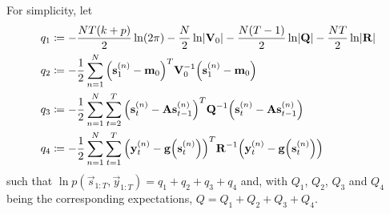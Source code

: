 	For simplicity, let
	\begin{align*}
		q_1 &\coloneqq -\frac{NT(k + p)}{2} \ln(2\pi) - \frac{N}{2} \ln \lvert \boldsymbol{\mathrm{V}}_0 \rvert - \frac{N(T - 1)}{2} \ln \lvert \boldsymbol{\mathrm{Q}} \rvert - \frac{NT}{2} \ln \lvert \boldsymbol{\mathrm{R}} \rvert \\
		q_2 &\coloneqq -\frac{1}{2} \sum_{n = 1}^{N} \Big( \boldsymbol{\mathrm{s}}_1^{(n)} - \boldsymbol{\mathrm{m}}_0 \Big)^T \boldsymbol{\mathrm{V}}_0^{-1} \Big( \boldsymbol{\mathrm{s}}_1^{(n)} - \boldsymbol{\mathrm{m}}_0 \Big) \\
		q_3 &\coloneqq -\frac{1}{2} \sum_{n = 1}^{N} \sum_{t = 2}^{T} \Big( \boldsymbol{\mathrm{s}}_t^{(n)} - \boldsymbol{\mathrm{A}} \boldsymbol{\mathrm{s}}_{t - 1}^{(n)} \Big)^T \boldsymbol{\mathrm{Q}}^{-1} \Big( \boldsymbol{\mathrm{s}}_t^{(n)} - \boldsymbol{\mathrm{A}} \boldsymbol{\mathrm{s}}_{t - 1}^{(n)} \Big) \\
		q_4 &\coloneqq -\frac{1}{2} \sum_{n = 1}^{N} \sum_{t = 1}^{T} \Big( \boldsymbol{\mathrm{y}}_t^{(n)} - \boldsymbol{\mathrm{g}}\Big(\boldsymbol{\mathrm{s}}_t^{(n)}\Big) \Big)^T \boldsymbol{\mathrm{R}}^{-1} \Big( \boldsymbol{\mathrm{y}}_t^{(n)} - \boldsymbol{\mathrm{g}}\Big(\boldsymbol{\mathrm{s}}_t^{(n)}\Big) \Big)
	\end{align*}
	such that \( \ln p(\vec{s}_{1:T}, \vec{y}_{1:T}) = q_1 + q_2 + q_3 + q_4 \) and, with \(Q_1\), \(Q_2\), \(Q_3\) and \(Q_4\) being the corresponding expectations, \( Q = Q_1 + Q_2 + Q_3 + Q_4 \).

